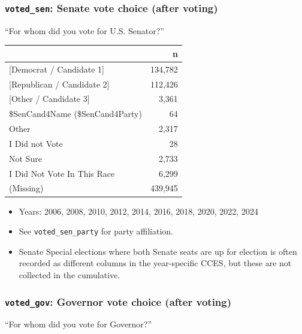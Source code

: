 \documentclass[10pt,article,oneside]{memoir}
\begin{document}
\subsubsection{\texorpdfstring{\texttt{voted\_sen}: Senate vote choice
(after
voting)}{voted\_sen: Senate vote choice (after voting)}}\label{voted_sen-senate-vote-choice-after-voting}

``For whom did you vote for U.S. Senator?''

\begin{table}[H]
\centering
\begin{tabular}[t]{lr}
\toprule
 & n\\
\midrule
{}{[Democrat / Candidate 1]} & 134,782\\
{}{[Republican / Candidate 2]} & 112,426\\
{}{[Other / Candidate 3]} & 3,361\\
\$SenCand4Name (\$SenCand4Party) & 64\\
Other & 2,317\\
I Did not Vote & 28\\
Not Sure & 2,733\\
I Did Not Vote In This Race & 6,299\\
(Missing) & 439,945\\
\bottomrule
\end{tabular}
\end{table}

\begin{itemize}
\tightlist
\item
  Years: 2006, 2008, 2010, 2012, 2014, 2016, 2018, 2020, 2022, 2024
\item
  See \texttt{voted\_sen\_party} for party affiliation.
\item
  Senate Special elections where both Senate seats are up for election
  is often recorded as different columns in the year-specific CCES, but
  these are not collected in the cumulative.
\end{itemize}

\subsubsection{\texorpdfstring{\texttt{voted\_gov}: Governor vote choice
(after
voting)}{voted\_gov: Governor vote choice (after voting)}}\label{voted_gov-governor-vote-choice-after-voting}

``For whom did you vote for Governor?''
\end{document}
